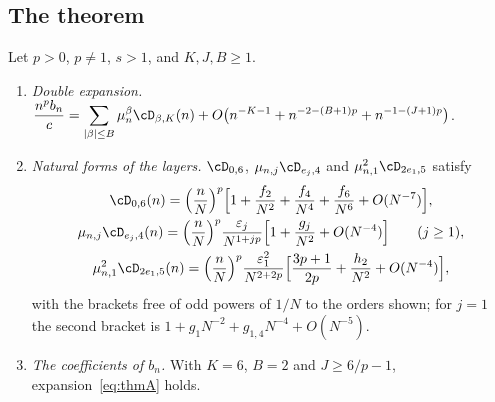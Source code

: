 \subsection{The theorem}\label{sec:N6}
\begin{theorem}\label{thm:N6}
Let $p>0$, $p\ne1$, $s>1$, and $K,J,B\ge1$.
\begin{enumerate}
\item[(i)] \emph{Double expansion.} $\displaystyle\frac{n^pb_n}c=\sum_{|\beta|\le B}\mu_n^\beta\cD_{\beta,K}(n)
  +O\bigl(n^{-K-1}+n^{-2-(B+1)p}+n^{-1-(J+1)p}\bigr)$.
\item[(ii)] \emph{Natural forms of the layers.} $\cD_{0,6}$, $\mu_{n,j}\cD_{e_j,4}$ and $\mu_{n,1}^2\cD_{2e_1,5}$ satisfy
\begin{gather*}
  \cD_{0,6}(n)=\Bigl(\frac nN\Bigr)^p\Bigl[1+\frac{f_2}{N^2}+\frac{f_4}{N^4}+\frac{f_6}{N^6}+O(N^{-7})\Bigr],\\
  \mu_{n,j}\cD_{e_j,4}(n)=\Bigl(\frac nN\Bigr)^p\frac{\varepsilon_j}{N^{1+jp}}\Bigl[1+\frac{g_j}{N^2}+O(N^{-4})\Bigr]\qquad(j\ge1),\\
  \mu_{n,1}^2\cD_{2e_1,5}(n)=\Bigl(\frac nN\Bigr)^p\frac{\varepsilon_1^2}{N^{2+2p}}\Bigl[\frac{3p+1}{2p}+\frac{h_2}{N^2}+O(N^{-4})\Bigr],
\end{gather*}
with the brackets free of odd powers of $1/N$ to the orders shown; for $j=1$ the second bracket is
$1+g_1N^{-2}+g_{1,4}N^{-4}+O(N^{-5})$.
\item[(iii)] \emph{The coefficients of $b_n$.} With $K=6$, $B=2$ and $J\ge6/p-1$, expansion~\eqref{eq:thmA} holds.
\end{enumerate}
\end{theorem}

